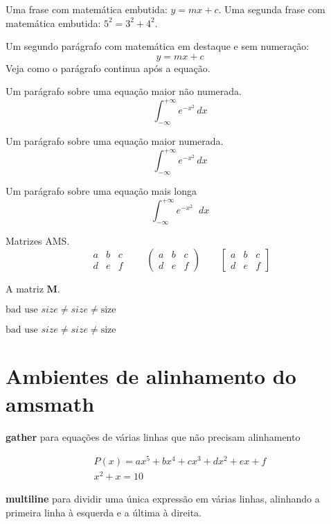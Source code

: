\documentclass{article}
\begin{document}
Uma frase com matemática embutida: $y = mx + c$.
Uma segunda frase com matemática embutida: $5^{2}=3^{2}+4^{2}$.

Um segundo parágrafo com matemática em destaque e sem numeração:
\[
y = mx + c
\]
Veja como o parágrafo continua após a equação.

Um parágrafo sobre uma equação maior não numerada.
\[
\int_{-\infty}^{+\infty} e^{-x^2} \, dx
\]

Um parágrafo sobre uma equação maior numerada.
\begin{equation}
	\int_{-\infty}^{+\infty} e^{-x^2} \, dx
\end{equation}



\newcommand{\diff}{\mathop{} \! d}            %
Um parágrafo sobre uma equação mais longa
\[
\int_{-\infty}^{+\infty} e^{-x^2} \diff x
\]


Matrizes AMS.
\[
\begin{matrix}
	a & b & c \\
	d & e & f
\end{matrix}
\qquad
\begin{pmatrix}
	a & b & c \\
	d & e & f
\end{pmatrix}
\qquad
\begin{bmatrix}
	a & b & c \\
	d & e & f
\end{bmatrix}
\]


A matriz $\mathbf{M}$.

$\text{bad use } size  \neq \mathit{size} \neq \mathrm{size} $

\textit{$\text{bad use } size \neq \mathit{size} \neq \mathrm{size} $}



\section{Ambientes de alinhamento do amsmath}


\textbf{gather} para equações de várias linhas que não precisam alinhamento

\begin{gather}
	P(x) = ax^{5} + bx^{4} + cx^{3} + dx^{2} + ex + f \\
	x^2 + x = 10
\end{gather}

\textbf{multiline} para dividir uma única expressão em várias linhas, alinhando a primeira linha à esquerda e a última à direita.
\end{document}
